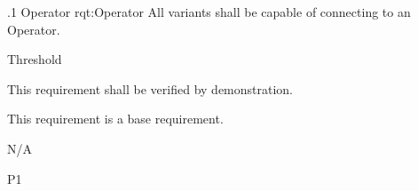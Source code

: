 \ONERQMTVKPP
{\RqtNumberBase.1}
{Operator}
{rqt:Operator}
{All \ThisSys variants shall be capable of connecting to an Operator.}
{
	\item [Phase 1] Threshold
}
{This requirement shall be verified by demonstration.}
{
	\item [N/A] This requirement is a base requirement.
}
{
  \item N/A
}
{P1}


